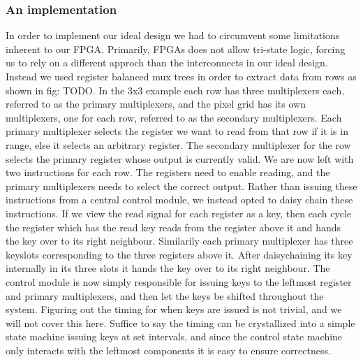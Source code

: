 \subsubsection{An implementation}
In order to implement our ideal design we had to circumvent some limitations inherent to our FPGA. Primarily, FPGAs does not allow tri-state logic, forcing us to rely on a different approch than the interconnects in our ideal design.
Instead we used register balanced mux trees in order to extract data from rows as shown in fig: TODO.
In the 3x3 example each row has three multiplexers each, referred to as the primary multiplexers, and the pixel grid has its own multiplexers, one for each row, referred to as the secondary multiplexers.
Each primary multiplexer selects the register we want to read from that row if it is in range, else it selects an arbitrary register. The secondary multiplexer for the row selects the primary register whose output is currently valid.
We are now left with two instructions for each row. The registers need to enable reading, and the primary multiplexers needs to select the correct output. 
Rather than issuing these instructions from a central control module, we instead opted to daisy chain these instructions.
If we view the read signal for each register as a key, then each cycle the register which has the read key reads from the register above it and hands the key over to its right neighbour.
Similarily each primary multiplexer has three keyslots corresponding to the three registers above it. After daisychaining its key internally in its three slots it hands the key over to its right neighbour.
The control module is now simply responsible for issuing keys to the leftmost register and primary multiplexers, and then let the keys be shifted throughout the system.
Figuring out the timing for when keys are issued is not trivial, and we will not cover this here.
Suffice to say the timing can be crystallized into a simple state machine issuing keys at set intervals, and since the control state machine only interacts with the leftmost components it is easy to ensure correctness.


